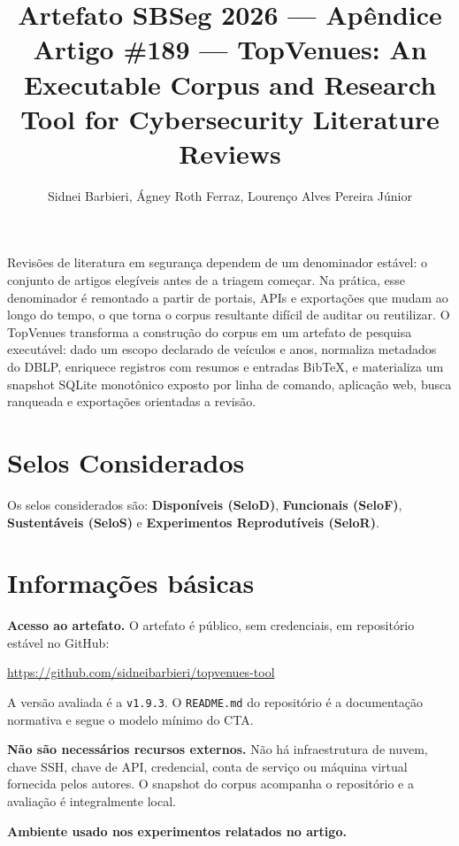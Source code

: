 \documentclass[12pt]{article}
\title{Artefato SBSeg 2026 --- Apêndice\\
Artigo \#189 --- TopVenues: An Executable Corpus and Research Tool for
Cybersecurity Literature Reviews}
\author{Sidnei Barbieri, Ágney Roth Ferraz, Lourenço Alves Pereira Júnior}
\begin{document}
\maketitle

\begin{resumo}
Revisões de literatura em segurança dependem de um denominador estável: o
conjunto de artigos elegíveis antes de a triagem começar. Na prática, esse
denominador é remontado a partir de portais, APIs e exportações que mudam ao
longo do tempo, o que torna o corpus resultante difícil de auditar ou reutilizar.
O TopVenues transforma a construção do corpus em um artefato de pesquisa
executável: dado um escopo declarado de veículos e anos, normaliza metadados do
DBLP, enriquece registros com resumos e entradas BibTeX, e materializa um
snapshot SQLite monotônico exposto por linha de comando, aplicação web, busca
ranqueada e exportações orientadas a revisão.
\end{resumo}

\section{Selos Considerados}

Os selos considerados são: \textbf{Disponíveis (SeloD)}, \textbf{Funcionais
(SeloF)}, \textbf{Sustentáveis (SeloS)} e \textbf{Experimentos Reprodutíveis
(SeloR)}.

\section{Informações básicas}

\textbf{Acesso ao artefato.} O artefato é público, sem credenciais, em
repositório estável no GitHub:

\begin{center}
\url{https://github.com/sidneibarbieri/topvenues-tool}
\end{center}

\noindent A versão avaliada é a \texttt{v1.9.3}. O \texttt{README.md} do
repositório é a documentação normativa e segue o modelo mínimo do CTA.

\textbf{Não são necessários recursos externos.} Não há infraestrutura de nuvem,
chave SSH, chave de API, credencial, conta de serviço ou máquina virtual
fornecida pelos autores. O snapshot do corpus acompanha o repositório e a
avaliação é integralmente local.

\textbf{Ambiente usado nos experimentos relatados no artigo.}
\end{document}
